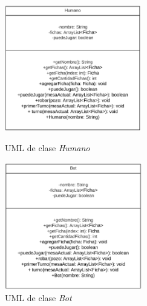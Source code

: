\documentclass[12pt]{article}
\begin{document}
  \begin{figure}[h!]
    \centering
    \begin{minipage}[l]{0.45\textwidth}
      \centering
      \includegraphics[height=5.5cm]{uml3.png}
      \caption{UML de clase \textit{Humano}}
    \end{minipage}
    \begin{minipage}[r]{0.45\textwidth}
      \centering
      \includegraphics[height=5.5cm]{uml4.png}
      \caption{UML de clase \textit{Bot}}
    \end{minipage}
  \end{figure}
\end{document}
